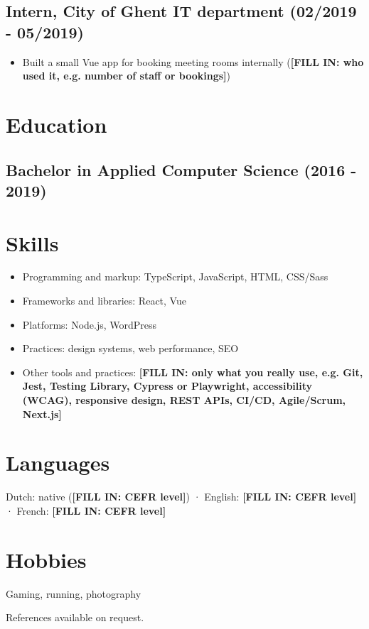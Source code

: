 \documentclass[10pt]{article}
\newcommand{\fillin}[1]{\textcolor{fillin}{\textbf{[#1]}}}
\begin{document}
\subsection*{Intern, City of Ghent IT department (02/2019 - 05/2019)}
\begin{itemize}
\item{} Built a small Vue app for booking meeting rooms internally (\fillin{FILL IN: who used it, e.g. number of staff or bookings})
\end{itemize}
\section*{Education}
\subsection*{Bachelor in Applied Computer Science (2016 - 2019)}
\section*{Skills}
\begin{itemize}
\item{} Programming and markup: TypeScript, JavaScript, HTML, CSS/Sass
\item{} Frameworks and libraries: React, Vue
\item{} Platforms: Node.js, WordPress
\item{} Practices: design systems, web performance, SEO
\item{} Other tools and practices: \fillin{FILL IN: only what you really use, e.g. Git, Jest, Testing Library, Cypress or Playwright, accessibility (WCAG), responsive design, REST APIs, CI/CD, Agile/Scrum, Next.js}
\end{itemize}
\section*{Languages}
Dutch: native (\fillin{FILL IN: CEFR level}) · English: \fillin{FILL IN: CEFR level} · French: \fillin{FILL IN: CEFR level}\par
\section*{Hobbies}
Gaming, running, photography\par
References available on request.\par
\end{document}
